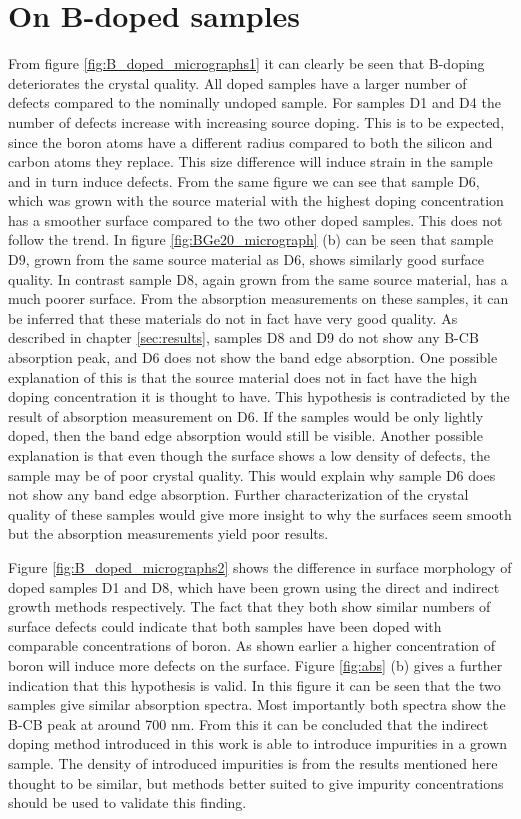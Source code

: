 \section{On B-doped samples}
From figure \ref{fig:B_doped_micrographs1} it can clearly be seen that B-doping deteriorates the crystal quality. All doped samples have a larger number of defects compared to the nominally undoped sample. For samples D1 and D4 the number of defects increase with increasing source doping. This is to be expected, since the boron atoms have a different radius compared to both the silicon and carbon atoms they replace. This size difference will induce strain in the sample and in turn induce defects. From the same figure we can see that sample D6, which was grown with the source material with the highest doping concentration has a smoother surface compared to the two other doped samples. This does not follow the trend. In figure \ref{fig:BGe20_micrograph} (b) can be seen that sample D9, grown from the same source material as D6, shows similarly good surface quality. In contrast sample D8, again grown from the same source material, has a much poorer surface. From the absorption measurements on these samples, it can be inferred that these materials do not in fact have very good quality. As described in chapter \ref{sec:results}, samples D8 and D9 do not show any B-CB absorption peak, and D6 does not show the band edge absorption. One possible explanation of this is that the source material does not in fact have the high doping concentration it is thought to have. This hypothesis is contradicted by the result of absorption measurement on D6. If the samples would be only lightly doped, then the band edge absorption would still be visible. Another possible explanation is that even though the surface shows a low density of defects, the sample may be of poor crystal quality. This would explain why sample D6 does not show any band edge absorption. Further characterization of the crystal quality of these samples would give more insight to why the surfaces seem smooth but the absorption measurements yield poor results. 

Figure \ref{fig:B_doped_micrographs2} shows the difference in surface morphology of doped samples D1 and D8, which have been grown using the direct and indirect growth methods respectively. The fact that they both show similar numbers of surface defects could indicate that both samples have been doped with comparable concentrations of boron. As shown earlier a higher concentration of boron will induce more defects on the surface. Figure \ref{fig:abs} (b) gives a further indication that this hypothesis is valid. In this figure it can be seen that the two samples give similar absorption spectra. Most importantly both spectra show the B-CB peak at around 700 nm. From this it can be concluded that the indirect doping method introduced in this work is able to introduce impurities in a grown sample. The density of introduced impurities is from the results mentioned here thought to be similar, but methods better suited to give impurity concentrations should be used to validate this finding. 

